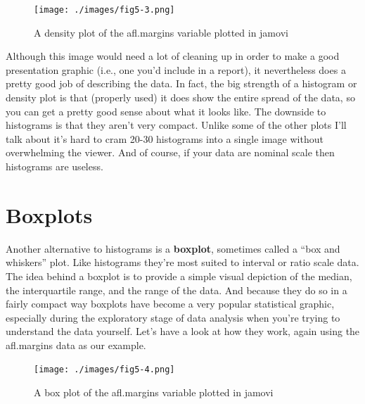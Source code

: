 \documentclass[
  letterpaper,
]{book}
\begin{document}
\begin{figure}

\texttt{[image: ./images/fig5-3.png]} \hfill{}

\caption{\label{fig-fig5-3}A density plot of the afl.margins variable
plotted in jamovi}

\end{figure}

Although this image would need a lot of cleaning up in order to make a
good presentation graphic (i.e., one you'd include in a report), it
nevertheless does a pretty good job of describing the data. In fact, the
big strength of a histogram or density plot is that (properly used) it
does show the entire spread of the data, so you can get a pretty good
sense about what it looks like. The downside to histograms is that they
aren't very compact. Unlike some of the other plots I'll talk about it's
hard to cram 20-30 histograms into a single image without overwhelming
the viewer. And of course, if your data are nominal scale then
histograms are useless.

\hypertarget{boxplots}{%
\section{Boxplots}\label{boxplots}}

Another alternative to histograms is a \textbf{boxplot}, sometimes
called a ``box and whiskers'' plot. Like histograms they're most suited
to interval or ratio scale data. The idea behind a boxplot is to provide
a simple visual depiction of the median, the interquartile range, and
the range of the data. And because they do so in a fairly compact way
boxplots have become a very popular statistical graphic, especially
during the exploratory stage of data analysis when you're trying to
understand the data yourself. Let's have a look at how they work, again
using the afl.margins data as our example.

\begin{figure}

\texttt{[image: ./images/fig5-4.png]} \hfill{}

\caption{\label{fig-fig5-4}A box plot of the afl.margins variable
plotted in jamovi}

\end{figure}
\end{document}
